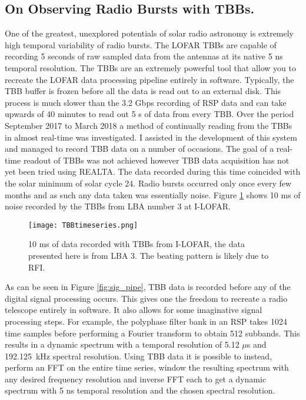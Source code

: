 \subsection{On Observing Radio Bursts with TBBs.}
One of the greatest, unexplored potentials of solar radio astronomy is extremely high temporal variability of radio bursts. The LOFAR TBBs are capable of recording 5 seconds of raw sampled data from the antennas at its native 5 ns temporal resolution. The TBBs are an extremely powerful tool that allow you to recreate the LOFAR data processing pipeline entirely in software. Typically, the TBB buffer is frozen before all the data is read out to an external disk. This process is much slower than the 3.2 Gbps recording of RSP data and can take upwards of 40 minutes to read out 5 s of data from every TBB. Over the period September 2017 to March 2018 a method of continually reading from the TBBs in almost real-time was investigated. I assisted in the development of this system and managed to record TBB data on a number of occasions. The goal of a real-time readout of TBBs was not achieved however TBB data acquisition has not yet been tried using REALTA. The data recorded during this time coincided with the solar minimum of solar cycle 24. Radio bursts occurred only once every few months and as such any data taken was essentially noise. Figure \ref{fig:TBB_timeseries} shows 10 ms of noise recorded by the TBBs from LBA number 3 at I-LOFAR.
%
\begin{figure}[ht]
\centering
\texttt{[image: TBBtimeseries.png]}
\caption[10 ms of data recorded with TBBs from I-LOFAR.]{10 ms of data recorded with TBBs from I-LOFAR, the data presented here is from LBA 3. The beating pattern is likely due to RFI.}
\label{fig:TBB_timeseries}
\end{figure}

As can be seen in Figure \ref{fig:sig_pipe}, TBB data is recorded before any of the digital signal processing occurs. This gives one the freedom to recreate a radio telescope entirely in software. It also allows for some imaginative signal processing steps. For example, the polyphase filter bank in an RSP takes 1024 time samples before performing a Fourier transform to obtain 512 subbands. This results in a dynamic spectrum with a temporal resolution of 5.12 $\mu$s and 192.125~kHz spectral resolution. Using TBB data it is possible to instead, perform an FFT on the entire time series, window the resulting spectrum with any desired frequency resolution and inverse FFT each to get a dynamic spectrum with 5 ns temporal resolution and the chosen spectral resolution. 

